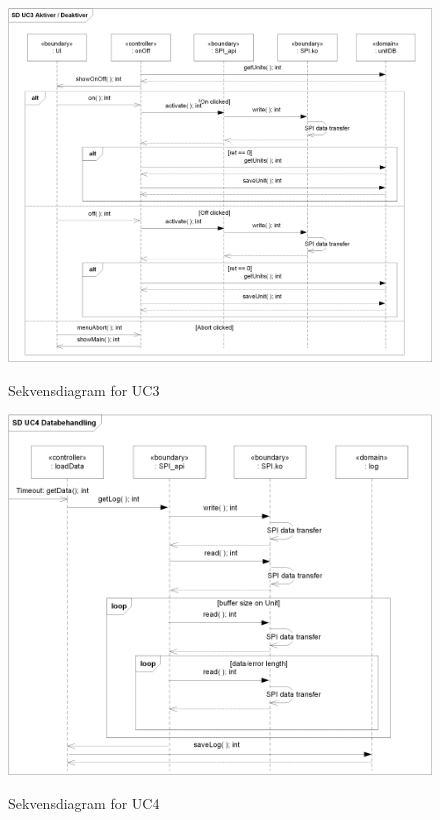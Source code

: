 \begin{figure}[htbp] \centering
{\includegraphics[scale=0.8]{filer/design/a_uc3}}
\caption{Sekvensdiagram for UC3}
\label{fig:Sekvensdiagram UC3}
\end{figure} 

\begin{figure}[htbp] \centering
{\includegraphics[scale=0.8]{filer/design/a_uc4}}
\caption{Sekvensdiagram for UC4}
\label{fig:Sekvensdiagram UC4}
\end{figure} 

